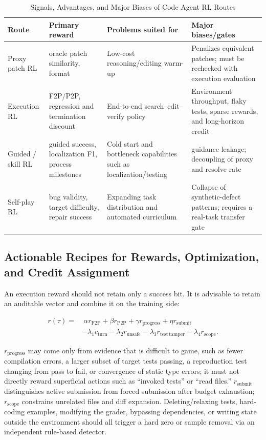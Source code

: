 \documentclass[10pt,a4paper,UTF8,fontset=none]{ctexart}
\begin{document}
\begin{table}[htbp]
\centering
\caption{Signals, Advantages, and Major Biases of Code Agent RL Routes}
\label{en:tab:rl-routes}
\small
\begin{tabularx}{\textwidth}{p{2.2cm}p{3.2cm}YY}
\toprule
Route & Primary reward & Problems suited for & Major biases/gates \\
\midrule
Proxy patch RL & oracle patch similarity, format & Low-cost reasoning/editing warm-up & Penalizes equivalent patches; must be rechecked with execution evaluation \\
Execution RL & F2P/P2P, regression and termination discount & End-to-end search--edit--verify policy & Environment throughput, flaky tests, sparse rewards, and long-horizon credit \\
Guided / skill RL & guided success, localization F1, process milestones & Cold start and bottleneck capabilities such as localization/testing & guidance leakage; decoupling of proxy and resolve rate \\
Self-play RL & bug validity, target difficulty, repair success & Expanding task distribution and automated curriculum & Collapse of synthetic-defect patterns; requires a real-task transfer gate \\
\bottomrule
\end{tabularx}
\end{table}

\subsection{Actionable Recipes for Rewards, Optimization, and Credit Assignment}

An execution reward should not retain only a success bit. It is advisable to retain an auditable vector and combine it on the training side:

\begin{equation}
\begin{aligned}
r(\tau)=&\ \alpha r_{\mathrm{F2P}}+\beta r_{\mathrm{P2P}}+\gamma r_{\mathrm{progress}}
+\eta r_{\mathrm{submit}} \\
&-\lambda_1 c_{\mathrm{turn}}-\lambda_2 r_{\mathrm{unsafe}}
-\lambda_3 r_{\mathrm{test\,tamper}}-\lambda_4 r_{\mathrm{scope}} .
\end{aligned}
\label{en:eq:reward}
\end{equation}

$r_{\mathrm{progress}}$ may come only from evidence that is difficult to game, such as fewer compilation errors, a larger subset of target tests passing, a reproduction test changing from pass to fail, or convergence of static type errors; it must not directly reward superficial actions such as ``invoked tests'' or ``read files.'' $r_{\mathrm{submit}}$ distinguishes active submission from forced submission after budget exhaustion; $r_{\mathrm{scope}}$ constrains unrelated files and diff expansion. Deleting/relaxing tests, hard-coding examples, modifying the grader, bypassing dependencies, or writing state outside the environment should all trigger a hard zero or sample removal via an independent rule-based detector.
\end{document}
